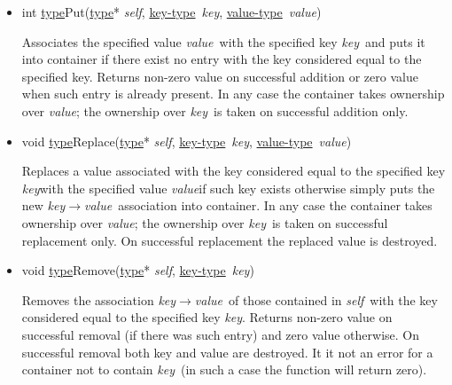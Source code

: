 \documentclass[a4paper]{article}
\newcommand{\st}{\underline{type}}
\newcommand{\kt}{\underline{key-type}}
\newcommand{\vt}{\underline{value-type}}
\newcommand{\sv}{\emph{self}}
\newcommand{\kv}{\emph{key}}
\newcommand{\vv}{\emph{value}}
\newcommand{\meth}[1]{#1}
\begin{document}
\begin{itemize}
\item \meth{int \st Put(\st* \sv, \kt\ \kv, \vt\ \vv)}


Associates the specified value \vv\ with the specified key \kv\ and puts it into container if there exist no entry with the key considered equal to the specified key.
Returns non-zero value on successful addition or zero value when such entry is already present.
In any case the container takes ownership over \vv; the ownership over \kv\ is taken on successful addition only.


\item \meth{void \st Replace(\st* \sv, \kt\ \kv, \vt\ \vv)}


Replaces a value associated with the key considered equal to the specified key \kv with the specified value \vv if such key exists otherwise simply puts the new \kv$\rightarrow$\vv\ association into container.
In any case the container takes ownership over \vv; the ownership over \kv\ is taken on successful replacement only.
On successful replacement the replaced value is destroyed.


\item \meth{void \st Remove(\st* \sv, \kt\ \kv)}


Removes the association \kv$\rightarrow$\vv\ of those contained in \sv\ with the key considered equal to the specified key \kv. 
Returns non-zero value on successful removal (if there was such entry) and zero value otherwise.
On successful removal both key and value are destroyed.
It it not an error for a container not to contain \kv\ (in such a case the function will return zero).


\end{itemize}
\end{document}
